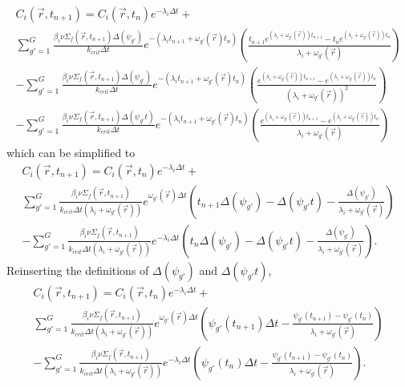 \documentclass[12pt]{report}
\begin{document}
	\begin{eqnarray}
	C_i(\vec{r},t_{n+1}) =  C_i(\vec{r},t_{n}) e^{-\lambda_i \Delta t} + \nonumber \\  \sum_{g'=1}^{G} \frac{\beta_i \nu\Sigma_f(\vec{r},t_{n+1}) \Delta(\psi_{g'})}{k_{crit} \Delta t} e^{-\left(\lambda_i t_{n+1} + \omega_{g'}(\vec{r}) t_n \right)}  \left( \frac{t_{n+1} e^{\left(\lambda_i + \omega_{g'}(\vec{r}) \right)  t_{n+1}} - t_n e^{\left(\lambda_i + \omega_{g'}(\vec{r}) \right)  t_{n}}}{\lambda_i + \omega_{g'}(\vec{r})} \right) \nonumber \\
	- \sum_{g'=1}^{G} \frac{\beta_i\nu\Sigma_f(\vec{r},t_{n+1}) \Delta(\psi_{g'})}{k_{crit} \Delta t} e^{-\left(\lambda_i t_{n+1} + \omega_{g'}(\vec{r}) t_n \right)} \left( \frac{e^{\left(\lambda_i + \omega_{g'}(\vec{r}) \right)  t_{n+1}} - e^{\left(\lambda_i + \omega_{g'}(\vec{r}) \right)  t_{n}}}{\left(\lambda_i + \omega_{g'}(\vec{r})\right)^2}\right)
	 \nonumber \\ 
	 - \sum_{g'=1}^{G} \frac{\beta_i\nu\Sigma_f(\vec{r},t_{n+1}) \Delta(\psi_{g'}t)}{k_{crit} \Delta t} e^{-\left(\lambda_i t_{n+1} + \omega_{g'}(\vec{r}) t_n \right)} \left(\frac{e^{\left(\lambda_i + \omega_{g'}(\vec{r}) \right)  t_{n+1}} - e^{\left(\lambda_i + \omega_{g'}(\vec{r}) \right)  t_{n}}}{\lambda_i + \omega_{g'}(\vec{r})}\right) \nonumber
	\end{eqnarray}
	which can be simplified to
	\begin{eqnarray}
	C_i(\vec{r},t_{n+1}) =  C_i(\vec{r},t_{n}) e^{-\lambda_i \Delta t} + \nonumber \\  \sum_{g'=1}^{G} \frac{\beta_i \nu\Sigma_f(\vec{r},t_{n+1})}{k_{crit} \Delta t \left(\lambda_i + \omega_{g'}(\vec{r})\right)} e^{ \omega_{g'}(\vec{r}) \Delta t} \left( t_{n+1} \Delta(\psi_{g'}) - \Delta(\psi_{g'}t) - \frac{\Delta(\psi_{g'})}{\lambda_i + \omega_{g'}(\vec{r})} \right) \nonumber \\ 
	- \sum_{g'=1}^{G} \frac{\beta_i \nu\Sigma_f(\vec{r},t_{n+1})}{k_{crit} \Delta t \left(\lambda_i + \omega_{g'}(\vec{r})\right)} e^{-\lambda_i \Delta t} \left( t_{n} \Delta(\psi_{g'}) - \Delta(\psi_{g'}t) - \frac{\Delta(\psi_{g'})}{\lambda_i + \omega_{g'}(\vec{r})} \right). \nonumber
	\end{eqnarray}	
	Reinserting the definitions of $\Delta(\psi_{g'})$ and $\Delta(\psi_{g'}t)$,
	\begin{eqnarray}
	C_i(\vec{r},t_{n+1}) =  C_i(\vec{r},t_{n}) e^{-\lambda_i \Delta t} + \nonumber \\  \sum_{g'=1}^{G} \frac{\beta_i \nu\Sigma_f(\vec{r},t_{n+1})}{k_{crit} \Delta t \left(\lambda_i + \omega_{g'}(\vec{r})\right)} e^{ \omega_{g'}(\vec{r}) \Delta t} \left( \psi_{g'}(t_{n+1}) \Delta t - \frac{\psi_{g'}(t_{n+1})-\psi_{g'}(t_{n})}{\lambda_i + \omega_{g'}(\vec{r})} \right) \nonumber \\ 
	- \sum_{g'=1}^{G} \frac{\beta_i \nu\Sigma_f(\vec{r},t_{n+1})}{k_{crit} \Delta t \left(\lambda_i + \omega_{g'}(\vec{r})\right)} e^{-\lambda_i \Delta t} \left( \psi_{g'}(t_{n}) \Delta t - \frac{\psi_{g'}(t_{n+1})-\psi_{g'}(t_{n})}{\lambda_i + \omega_{g'}(\vec{r})} \right) \nonumber.
	\end{eqnarray}
\end{document}
